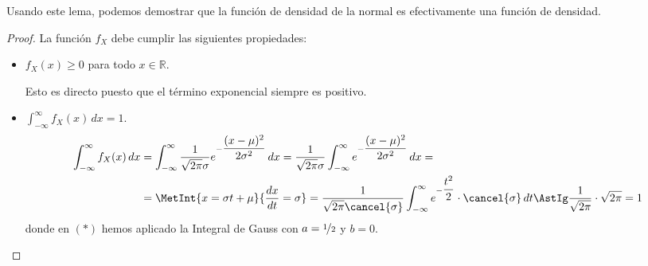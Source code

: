Usando este lema, podemos demostrar que la función de densidad de la normal es efectivamente una función de densidad.
\begin{proof}
    La función $f_X$ debe cumplir las siguientes propiedades:
    \begin{itemize}
        \item $f_X(x)\geq 0$ para todo $x\in \mathbb{R}$.
        
        Esto es directo puesto que el término exponencial siempre es positivo.
        
        \item $\displaystyle \int_{-\infty}^{\infty} f_X(x) \, dx = 1$.
        \begin{align*}
            \int_{-\infty}^{\infty} f_X(x) \, dx &= \int_{-\infty}^{\infty} \dfrac{1}{\sqrt{2\pi}\sigma} e^{-\dfrac{(x-\mu)^2}{2\sigma^2}} \, dx = \dfrac{1}{\sqrt{2\pi}\sigma} \int_{-\infty}^{\infty} e^{-\dfrac{(x-\mu)^2}{2\sigma^2}} \, dx =\\
            &= \MetInt{x=\sigma t +\mu}{\dfrac{dx}{dt} = \sigma} = \dfrac{1}{\sqrt{2\pi}\cancel{\sigma}} \int_{-\infty}^{\infty} e^{-\dfrac{t^2}{2}} \cdot \cancel{\sigma}\, dt \AstIg \dfrac{1}{\sqrt{2\pi}} \cdot \sqrt{2\pi} = 1
        \end{align*}
        donde en $(\ast)$ hemos aplicado la Integral de Gauss con $a=\nicefrac{1}{2}$ y $b=0$.
    \end{itemize}
\end{proof}


